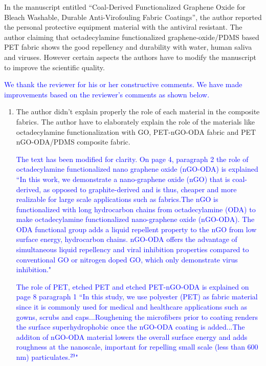 \documentclass[12pt]{letter}
\newcommand{\blue}[1]{\textcolor{blue}{#1}} %
\begin{document}
In the manuscript entitled “Coal-Derived Functionalized Graphene Oxide for Bleach Washable, Durable Anti-Virofouling Fabric Coatings”, the author reported the personal protective equipment material with the antiviral resistant. The author claiming that octadecylamine functionalized graphene-oxide/PDMS based PET fabric shows the good repellency and durability with water, human saliva and viruses. However certain aspects the authors have to modify the manuscript to improve the scientific quality. 

\blue{We thank the reviewer for his or her constructive comments.
We have made improvements based on the reviewer's comments as shown below.}

\begin{enumerate}
\item The author didn’t explain properly the role of each material in the composite fabrics. The author have to elaborately explain the role of the materials like octadecylamine functionalization with GO, PET-nGO-ODA fabric and PET nGO-ODA/PDMS composite fabric.

\blue{
The text has been modified for 
clarity. On page 4, paragraph 2 the role of octadecylamine functionalized nano graphene oxide (nGO-ODA) is explained ``In this work, we demonstrate a nano-graphene oxide (nGO) that is coal-derived, 
as opposed to graphite-derived and is 
thus, cheaper and more realizable for large scale applications such as fabrics.The nGO is functionalized with long hydrocarbon chains from octadecylamine (ODA) to make  octadecylamine functionalized nano-graphene oxide (nGO-ODA). The ODA functional group adds a liquid repellent property to the nGO from low surface energy, hydrocarbon chains. nGO-ODA offers the advantage of simultaneous liquid repellency and viral inhibition properties compared to conventional GO or nitrogen doped GO, which only demonstrate virus inhibition."}




\blue{The role of PET, etched PET and etched PET-nGO-ODA is explained on page 8 paragraph 1 ``In this study, we use polyester (PET) as fabric material since it is commonly used for medical and healthcare applications such as gowns, scrubs and caps...Roughening the microfibers prior to coating renders the surface superhydrophobic once the nGO-ODA coating is added...The additon of nGO-ODA material lowers the overall surface energy and adds roughness at the nanoscale, important for repelling small scale (less than 600 nm) particulates.$^{29}$"}




\end{enumerate}
\end{document}

